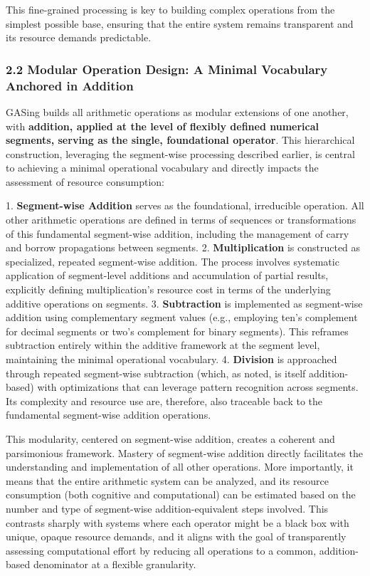 This fine-grained processing is key to building complex operations from the simplest possible base, ensuring that the entire system remains transparent and its resource demands predictable.
\subsubsection{2.2 Modular Operation Design: A Minimal Vocabulary Anchored in Addition}

GASing builds all arithmetic operations as modular extensions of one another, with \textbf{addition, applied at the level of flexibly defined numerical segments, serving as the single, foundational operator}. This hierarchical construction, leveraging the segment-wise processing described earlier, is central to achieving a minimal operational vocabulary and directly impacts the assessment of resource consumption:

1.  \textbf{Segment-wise Addition} serves as the foundational, irreducible operation. All other arithmetic operations are defined in terms of sequences or transformations of this fundamental segment-wise addition, including the management of carry and borrow propagations between segments.
2.  \textbf{Multiplication} is constructed as specialized, repeated segment-wise addition. The process involves systematic application of segment-level additions and accumulation of partial results, explicitly defining multiplication's resource cost in terms of the underlying additive operations on segments.
3.  \textbf{Subtraction} is implemented as segment-wise addition using complementary segment values (e.g., employing ten's complement for decimal segments or two's complement for binary segments). This reframes subtraction entirely within the additive framework at the segment level, maintaining the minimal operational vocabulary.
4.  \textbf{Division} is approached through repeated segment-wise subtraction (which, as noted, is itself addition-based) with optimizations that can leverage pattern recognition across segments. Its complexity and resource use are, therefore, also traceable back to the fundamental segment-wise addition operations.

This modularity, centered on segment-wise addition, creates a coherent and parsimonious framework. Mastery of segment-wise addition directly facilitates the understanding and implementation of all other operations. More importantly, it means that the entire arithmetic system can be analyzed, and its resource consumption (both cognitive and computational) can be estimated based on the number and type of segment-wise addition-equivalent steps involved. This contrasts sharply with systems where each operator might be a black box with unique, opaque resource demands, and it aligns with the goal of transparently assessing computational effort by reducing all operations to a common, addition-based denominator at a flexible granularity.
